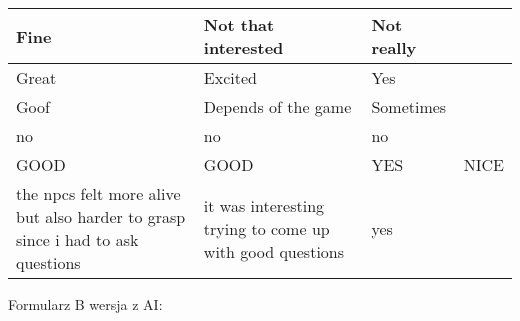 \begin{table}[!ht]
\begin{tabular}{|m{7.5em}|m{7.5em}|m{7.5em}|m{7.5em}|}
        Fine & Not that interested & Not really & ~ \\ \hline
        Great & Excited & Yes & ~ \\ \hline
        Goof & Depends of the game & Sometimes & ~ \\ \hline
        no & no & no & ~ \\ \hline
        GOOD & GOOD & YES & NICE \\ \hline
        the npcs felt more alive but also harder to grasp since i had to ask questions & it was interesting trying to come up with good questions & yes & ~ \\ \hline
    \end{tabular}
\end{table}

Formularz B wersja z AI:

